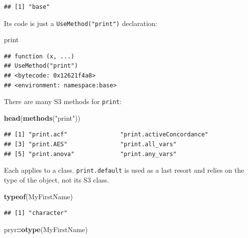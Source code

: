 \documentclass[
  12pt,
  american,
  a4paper,
  extrafontsizes,onecolumn,openright
  ]{memoir}
\newenvironment{Shaded}{\begin{snugshade}}{\end{snugshade}}
\newcommand{\FunctionTok}[1]{\textcolor[rgb]{0.13,0.29,0.53}{\textbf{#1}}}
\newcommand{\NormalTok}[1]{#1}
\newcommand{\SpecialCharTok}[1]{\textcolor[rgb]{0.81,0.36,0.00}{\textbf{#1}}}
\newcommand{\StringTok}[1]{\textcolor[rgb]{0.31,0.60,0.02}{#1}}
\begin{document}
\begin{verbatim}
## [1] "base"
\end{verbatim}

\normalsize

Its code is just a \texttt{UseMethod("print")} declaration:

\scriptsize

\begin{Shaded}
\begin{Highlighting}[]
\NormalTok{print}
\end{Highlighting}
\end{Shaded}

\begin{verbatim}
## function (x, ...) 
## UseMethod("print")
## <bytecode: 0x12621f4a8>
## <environment: namespace:base>
\end{verbatim}

\normalsize

There are many S3 methods for \texttt{print}:

\scriptsize

\begin{Shaded}
\begin{Highlighting}[]
\FunctionTok{head}\NormalTok{(}\FunctionTok{methods}\NormalTok{(}\StringTok{"print"}\NormalTok{))}
\end{Highlighting}
\end{Shaded}

\begin{verbatim}
## [1] "print.acf"               "print.activeConcordance"
## [3] "print.AES"               "print.all_vars"         
## [5] "print.anova"             "print.any_vars"
\end{verbatim}

\normalsize

Each applies to a class. \texttt{print.default} is used as a last resort and relies on the type of the object, not its S3 class.

\scriptsize

\begin{Shaded}
\begin{Highlighting}[]
\FunctionTok{typeof}\NormalTok{(MyFirstName)}
\end{Highlighting}
\end{Shaded}

\begin{verbatim}
## [1] "character"
\end{verbatim}

\begin{Shaded}
\begin{Highlighting}[]
\NormalTok{pryr}\SpecialCharTok{::}\FunctionTok{otype}\NormalTok{(MyFirstName)}
\end{Highlighting}
\end{Shaded}
\end{document}
